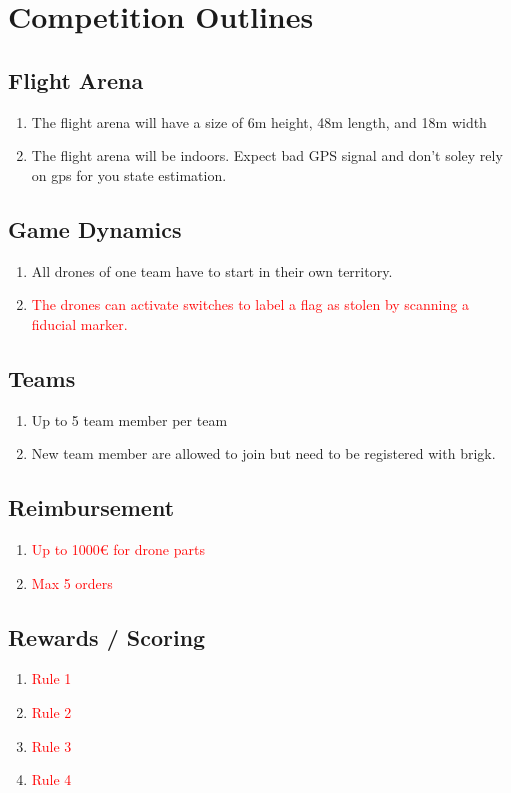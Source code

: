\section{Competition Outlines}

\subsection{Flight Arena}
\begin{enumerate}
	\item{The flight arena will have a size of 6m height, 48m length, and 18m width}
	\item{The flight arena will be indoors. Expect bad GPS signal and don't soley rely on gps for you state estimation.}
\end{enumerate}

\subsection{Game Dynamics}
\begin{enumerate}
	\item{All drones of one team have to start in their own territory.}
	\item{\textcolor{red}{The drones can activate switches to label a flag as stolen by scanning a fiducial marker.}}
\end{enumerate}

\subsection{Teams}
\begin{enumerate}
	\item{Up to 5 team member per team}
	\item{New team member are allowed to join but need to be registered with brigk.}
\end{enumerate}

\subsection{Reimbursement}
\begin{enumerate}
	\item{\textcolor{red}{Up to 1000€ for drone parts}}
	\item{\textcolor{red}{Max 5 orders}}
\end{enumerate}

\subsection{Rewards / Scoring}
\begin{enumerate}
	\item{\textcolor{red}{Rule 1}}
	\item{\textcolor{red}{Rule 2}}
	\item{\textcolor{red}{Rule 3}}
	\item{\textcolor{red}{Rule 4}}
\end{enumerate}

